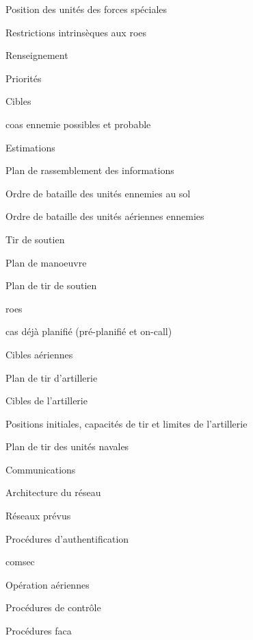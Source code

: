 \begin{e1}
\begin{e2}
\begin{e3}
\begin{e4}
\begin{e5}
					\item Position des unités des forces spéciales
					\item Restrictions intrinsèques aux \glspl{roe}
				\end{e5}
				\item Renseignement
				\begin{e5}[0em]
					\item Priorités
					\item Cibles
					\item \glspl{coa} ennemie possibles et probable
					\item Estimations
					\item Plan de rassemblement des informations
					\item Ordre de bataille des unités ennemies au sol
					\item Ordre de bataille des unités aériennes ennemies
				\end{e5}
				\item Tir de soutien
				\begin{e5}[0em]
					\item Plan de manoeuvre
					\item Plan de tir de soutien
					\item \glspl{roe}
					\item \gls{cas} déjà planifié (pré-planifié et on-call)
					\item Cibles aériennes
					\item Plan de tir d'artillerie
					\item Cibles de l'artillerie
					\item Positions initiales, capacités de tir et limites de l'artillerie
					\item Plan de tir des unités navales
				\end{e5}
				\item Communications
				\begin{e5}[0em]
					\item Architecture du réseau
					\item Réseaux prévus
					\item Procédures d'authentification
					\item \gls{comsec}
				\end{e5}
				\item Opération aériennes
				\begin{e5}[0em]
					\item Procédures de contrôle
					\item Procédures \gls{faca}

\end{e5}
\end{e4}
\end{e3}
\end{e2}
\end{e1}
